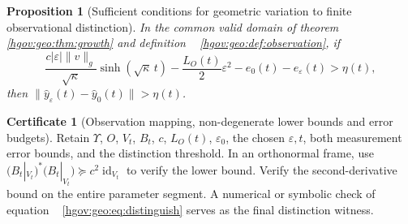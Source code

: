 \documentclass[12pt,a4paper,openany,notitlepage]{report}
\theoremstyle{plain}
\newtheorem{proposition}[theorem]{Proposition}
\theoremstyle{definition}
\newtheorem*{certificate}{Certificate}
\theoremstyle{remark}
\def\mathcal#1{#1}\def\mathsf#1{#1}\def\mathbb#1{#1}%
\begin{document}
\begin{CJK*}
\begin{proposition}
[Sufficient conditions for geometric variation to finite observational distinction]\label{hgov:geo:prop:distinguish}
In the common valid domain of theorem ~ \ref{hgov:geo:thm:growth} and definition ~ \ref{hgov:geo:def:observation}, if \begin{equation}
\label{hgov:geo:eq:distinguish}
\frac{c|\varepsilon|\lVert v\rVert_g}{\sqrt\kappa}
\sinh(\sqrt\kappa\,t)
-\frac{L_{\mathcal O}(t)}2\varepsilon^2
-e_0(t)-e_\varepsilon(t)>\eta(t),
\end{equation} then $\lVert\widehat y_\varepsilon(t)-\widehat y_0(t)\rVert>\eta(t)$.\end{proposition}


\begin{certificate}
[Observation mapping, non-degenerate lower bounds and error budgets]Retain $\Upsilon$, $\mathcal O$, $V_t$, $B_t$, $c$, $L_{\mathcal O}(t)$, $\varepsilon_0$, the chosen $\varepsilon,t$, both measurement error bounds, and the distinction threshold. In an orthonormal frame, use $\bigl(B_t|_{V_t}\bigr)^*\bigl(B_t|_{V_t}\bigr)\succeq c^2\operatorname{id}_{V_t}$ to verify the lower bound. Verify the second-derivative bound on the entire parameter segment. A numerical or symbolic check of equation ~ \eqref{hgov:geo:eq:distinguish} serves as the final distinction witness.\end{certificate}



\end{CJK*}
\end{document}
